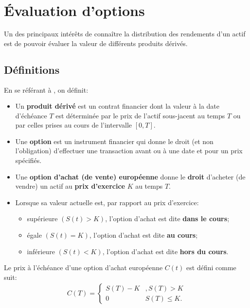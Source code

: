 \chapter{Évaluation d'options}
\label{chap:options}
Un des principaux intérêts de connaître la distribution des rendements
d'un actif est de pouvoir évaluer la valeur de différents produits
dérivés.

\section{Définitions}
\label{sec:options}
En se référant à \cite{bingham2004risk}, on définit:

\begin{itemize}
\item Un \textbf{produit dérivé} est un contrat financier dont la
  valeur à la date d'échéance $T$ est déterminée par le prix de
  l'actif sous-jacent au temps $T$ ou par celles prises au cours de
  l'intervalle $\left[0,T \right]$.
\item Une \textbf{option} est un instrument financier qui donne le
  droit (et non l'obligation) d'effectuer une transaction avant ou à
  une date et pour un prix spécifiés.
\item Une \textbf{option d'achat (de vente) européenne} donne le
  \textbf{droit} d'acheter (de vendre) un actif au \textbf{prix
    d'exercice} $K$ au temps $T$.
\item Lorsque sa valeur actuelle est, par rapport au prix
  d'exercice:
  \begin{itemize}
  \item supérieure $(S(t)>K)$, l'option d'achat est dite \textbf{dans le
      cours};
  \item égale $(S(t)=K)$, l'option d'achat est dite \textbf{au cours};
  \item inférieure $(S(t)<K)$, l'option d'achat est dite \textbf{hors du
      cours}.
  \end{itemize}
\end{itemize}

Le prix à l'échéance d'une option d'achat européenne $C(t)$ est défini
comme suit:
\begin{align}
  \label{eq:callpayoff}
  C(T) = \left\{ \begin{array}{cc} 
      S(T)-K & ,S(T) > K \\
      0 & S(T) \leq K.
    \end{array} \right.
\end{align}

